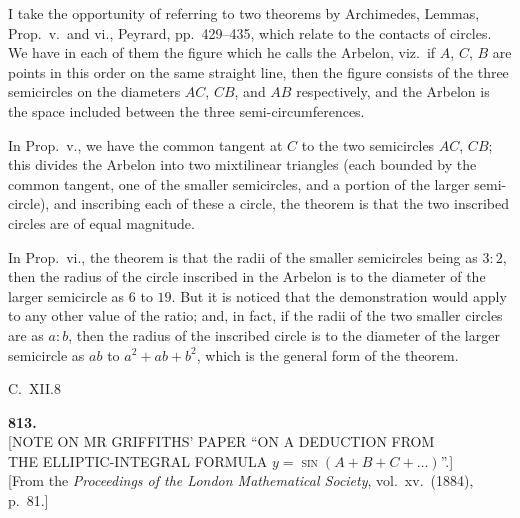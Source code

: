 \documentclass[11pt,a4paper]{article}
\begin{document}
\medskip
I take the opportunity of referring to two theorems by Archimedes, Lemmas, Prop.~v.\ and vi., Peyrard, pp.~429--435, which relate to the contacts of circles.  We have in each of them the figure which he calls the Arbelon, viz.\ if $A$, $C$, $B$ are points in this order on the same straight line, then the figure consists of the three semicircles on the diameters $AC$, $CB$, and $AB$ respectively, and the Arbelon is the space included between the three semi-circumferences.

\medskip
In Prop.~v., we have the common tangent at $C$ to the two semicircles $AC$, $CB$; this divides the Arbelon into two mixtilinear triangles (each bounded by the common tangent, one of the smaller semicircles, and a portion of the larger semi-circle), and inscribing each of these a circle, the theorem is that the two inscribed circles are of equal magnitude.

\medskip
In Prop.~vi., the theorem is that the radii of the smaller semicircles being as $3 : 2$, then the radius of the circle inscribed in the Arbelon is to the diameter of the larger semicircle as $6$ to $19$.  But it is noticed that the demonstration would apply to any other value of the ratio; and, in fact, if the radii of the two smaller circles are as $a : b$, then the radius of the inscribed circle is to the diameter of the larger semicircle as $ab$ to $a^{2} + ab + b^{2}$, which is the general form of the theorem.

\vfill
\noindent C.\ XII.\hfill 8
\clearpage

\fancyhead[C]{\small\ }
\fancyhead[R]{\small [813}

\thispagestyle{plain}
\begin{center}
\vspace*{2em}
{\Large\bfseries 813.}\\[1.5em]
{\normalsize\scshape [NOTE ON MR GRIFFITHS' PAPER ``ON A DEDUCTION FROM}\\[0.3em]
{\normalsize\scshape THE ELLIPTIC-INTEGRAL FORMULA $y = \sin(A+B+C+\ldots)$''.]}\\[1em]
{\small [From the \textit{Proceedings of the London Mathematical Society}, vol.~xv.\ (1884), p.~81.]}
\end{center}
\end{document}
